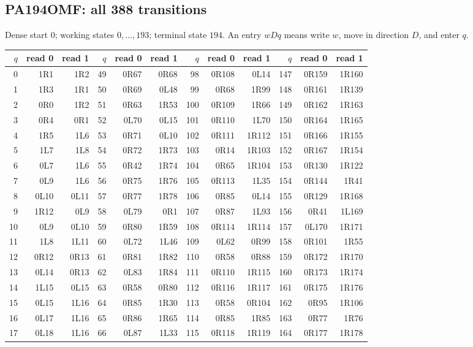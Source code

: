 \clearpage
\subsection{PA194OMF: all 388 transitions}
\label{tab:PA194OMF}
Dense start $0$; working states $0,\ldots,193$; terminal state $194$.
An entry $wDq$ means write $w$, move in direction $D$, and enter $q$.
\begin{center}\footnotesize\ttfamily
\setlength{\tabcolsep}{6pt}
\renewcommand{\arraystretch}{0.90}
\begin{tabular}{rrr@{\hspace{12pt}}rrr@{\hspace{12pt}}rrr@{\hspace{12pt}}rrr}
\toprule
$q$&read 0&read 1&$q$&read 0&read 1&$q$&read 0&read 1&$q$&read 0&read 1\\
\midrule
0&1R1&1R2&49&0R67&0R68&98&0R108&0L14&147&0R159&1R160\\
1&1R3&1R1&50&0R69&0L48&99&0R68&1R99&148&0R161&1R139\\
2&0R0&1R2&51&0R63&1R53&100&0R109&1R66&149&0R162&1R163\\
3&0R4&0R1&52&0L70&0L15&101&0R110&1L70&150&0R164&1R165\\
4&1R5&1L6&53&0R71&0L10&102&0R111&1R112&151&0R166&1R155\\
5&1L7&1L8&54&0R72&1R73&103&0R14&1R103&152&0R167&1R154\\
6&0L7&1L6&55&0R42&1R74&104&0R65&1R104&153&0R130&1R122\\
7&0L9&1L6&56&0R75&1R76&105&0R113&1L35&154&0R144&1R41\\
8&0L10&0L11&57&0R77&1R78&106&0R85&0L14&155&0R129&1R168\\
9&1R12&0L9&58&0L79&0R1&107&0R87&1L93&156&0R41&1L169\\
10&0L9&0L10&59&0R80&1R59&108&0R114&1R114&157&0L170&1R171\\
11&1L8&1L11&60&0L72&1L46&109&0L62&0R99&158&0R101&1R55\\
12&0R12&0R13&61&0R81&1R82&110&0R58&0R88&159&0R172&1R170\\
13&0L14&0R13&62&0L83&1R84&111&0R110&1R115&160&0R173&1R174\\
14&1L15&0L15&63&0R58&0R80&112&0R116&1R117&161&0R175&1R176\\
15&0L15&1L16&64&0R85&1R30&113&0R58&0R104&162&0R95&1R106\\
16&0L17&1L16&65&0R86&1R65&114&0R85&1R85&163&0R77&1R76\\
17&0L18&1L16&66&0L87&1L33&115&0R118&1R119&164&0R177&1R178\\

\end{tabular}
\end{center}
